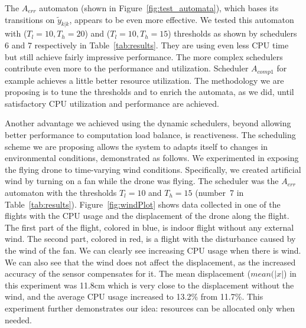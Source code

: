 \documentclass{sig-alternate-ipsn13}
\begin{document}
The $A_{err}$ automaton (shown in Figure~\ref{fig:test_automata}), which bases its transitions on $\tilde{y}_{k|k}$, appears to be even more effective.
We tested this automaton with ($T_l=10 , T_h=20$) and ($T_l=10 , T_h=15$) thresholds as shown by schedulers 6 and 7 respectively in Table~\ref{tab:results}.
They are using even less CPU time but still achieve fairly impressive performance.
The more complex schedulers contribute even more to the performance and utilization. Scheduler $A_{comp1}$ for example achieves a little better resource utilization.
The methodology we are proposing is to tune the thresholds and to enrich the automata, as we did, until satisfactory CPU utilization and performance are achieved.

Another advantage we achieved using the dynamic schedulers, beyond allowing better performance to computation load balance, is reactiveness. The  scheduling scheme we are proposing allows the system to adapts itself to changes in environmental conditions, demonstrated as follows.
We experimented in exposing the flying drone to time-varying wind conditions. 
Specifically, we created artificial wind by turning  on a fan while the drone was flying. The scheduler was the $A_{err}$ automaton with the thresholds $T_l=10$ and $T_h=15$ (number~7 in Table~\ref{tab:results}).
Figure~\ref{fig:windPlot} shows data collected in one of the flights with the CPU usage and the displacement of the drone along the flight. The first part of the flight, colored in blue, is indoor flight without any external wind. The second part, colored in red, is a flight with the disturbance caused by the wind of the fan. We can clearly see increasing CPU usage when there is wind. We can also see that the wind does not affect the displacement, as the increased accuracy of the sensor compensates for it. The mean displacement ($mean(|x|$) in this experiment was 11.8cm which is very close to the displacement without the wind, and the average CPU usage increased to  13.2\% from 11.7\%. This experiment further demonstrates our idea: resources can be allocated only when needed.
\end{document}
